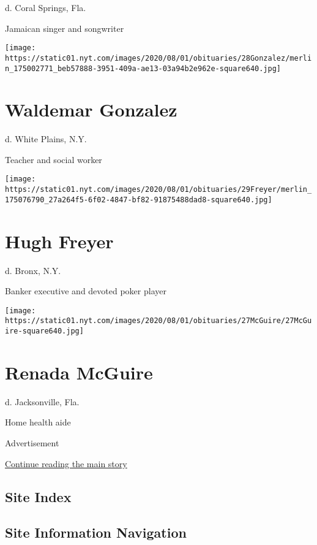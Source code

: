 d. Coral Springs, Fla.

Jamaican singer and songwriter

\texttt{[image: https://static01.nyt.com/images/2020/08/01/obituaries/28Gonzalez/merlin\_175002771\_beb57888-3951-409a-ae13-03a94b2e962e-square640.jpg]}

\hypertarget{waldemar-gonzalez}{%
\section{Waldemar Gonzalez}\label{waldemar-gonzalez}}

d. White Plains, N.Y.

Teacher and social worker

\texttt{[image: https://static01.nyt.com/images/2020/08/01/obituaries/29Freyer/merlin\_175076790\_27a264f5-6f02-4847-bf82-91875488dad8-square640.jpg]}

\hypertarget{hugh-freyer}{%
\section{Hugh Freyer}\label{hugh-freyer}}

d. Bronx, N.Y.

Banker executive and devoted poker player

\texttt{[image: https://static01.nyt.com/images/2020/08/01/obituaries/27McGuire/27McGuire-square640.jpg]}

\hypertarget{renada-mcguire}{%
\section{Renada McGuire}\label{renada-mcguire}}

d. Jacksonville, Fla.

Home health aide

Advertisement

\protect\hyperlink{after-bottom}{Continue reading the main story}

\hypertarget{site-index}{%
\subsection{Site Index}\label{site-index}}

\hypertarget{site-information-navigation}{%
\subsection{Site Information
Navigation}\label{site-information-navigation}}

